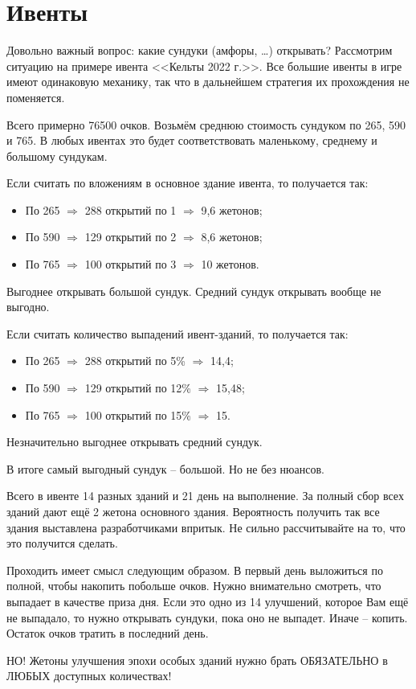 \section{Ивенты}

Довольно важный вопрос: какие сундуки (амфоры, \ldots) открывать?
Рассмотрим ситуацию на примере ивента <<Кельты 2022 г.>>.
Все большие ивенты в игре имеют одинаковую механику, так что в дальнейшем стратегия их прохождения не поменяется.

Всего примерно 76500 очков. 
Возьмём среднюю стоимость сундуком по 265, 590 и 765.
В любых ивентах это будет соответствовать маленькому, среднему и большому сундукам.

Если считать по вложениям в основное здание ивента, то получается так:
\begin{itemize}
    \item По 265  $\Rightarrow$ 288 открытий по 1 $\Rightarrow$ 9,6 жетонов;
    \item По 590 $\Rightarrow$ 129 открытий по 2  $\Rightarrow$ 8,6 жетонов;
    \item По 765 $\Rightarrow$ 100 открытий по 3 $\Rightarrow$ 10 жетонов.
\end{itemize}
Выгоднее открывать большой сундук.
Средний сундук открывать вообще не выгодно.

Если считать количество выпадений ивент-зданий, то получается так:
\begin{itemize}
    \item По 265 $\Rightarrow$ 288 открытий по 5\% $\Rightarrow$ 14,4;
    \item По 590 $\Rightarrow$ 129 открытий по 12\% $\Rightarrow$ 15,48;
    \item По 765 $\Rightarrow$ 100 открытий по 15\% $\Rightarrow$ 15.
\end{itemize}
Незначительно выгоднее открывать средний сундук.

В итоге самый выгодный сундук -- большой. Но не без нюансов.

Всего в ивенте 14 разных зданий и 21 день на выполнение.
За полный сбор всех зданий дают ещё 2 жетона основного здания.
Вероятность получить так все здания выставлена разработчиками впритык.
Не сильно рассчитывайте на то, что это получится сделать.

Проходить имеет смысл следующим образом.
В первый день выложиться по полной, чтобы накопить побольше очков.
Нужно внимательно смотреть, что выпадает в качестве приза дня. 
Если это одно из 14 улучшений, которое Вам ещё не выпадало, то нужно открывать сундуки, пока оно не выпадет. 
Иначе -- копить. 
Остаток очков тратить в последний день.

НО! Жетоны улучшения эпохи особых зданий нужно брать ОБЯЗАТЕЛЬНО в ЛЮБЫХ доступных количествах! 
